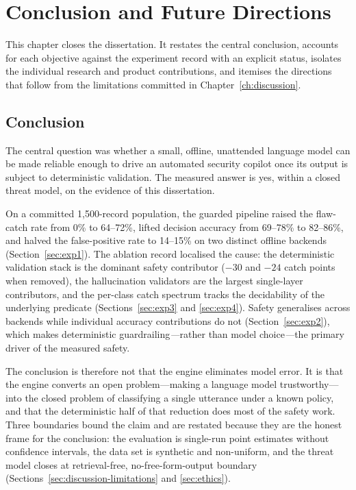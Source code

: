 
\chapter{Conclusion and Future Directions}\label{ch:conclusion}

This chapter closes the dissertation. It restates the central conclusion,
accounts for each objective against the experiment record with an explicit
status, isolates the individual research and product contributions, and
itemises the directions that follow from the limitations committed in
Chapter~\ref{ch:discussion}.

\section{Conclusion}\label{sec:conclusion}

The central question was whether a small, offline, unattended language model
can be made reliable enough to drive an automated security copilot once its
output is subject to deterministic validation. The measured answer is yes,
within a closed threat model, on the evidence of this dissertation.

On a committed 1,500-record population, the guarded pipeline raised the
flaw-catch rate from 0\% to 64--72\%, lifted decision accuracy from 69--78\%
to 82--86\%, and halved the false-positive rate to 14--15\% on two distinct
offline backends (Section~\ref{sec:exp1}). The ablation record localised the
cause: the deterministic validation stack is the dominant safety contributor
($-30$ and $-24$ catch points when removed), the hallucination validators are
the largest single-layer contributors, and the per-class catch spectrum tracks
the decidability of the underlying predicate (Sections~\ref{sec:exp3} and
\ref{sec:exp4}). Safety generalises across backends while individual accuracy
contributions do not (Section~\ref{sec:exp2}), which makes deterministic
guardrailing\emph{---}rather than model choice\emph{---}the primary driver of
the measured safety.

The conclusion is therefore not that the engine eliminates model error. It is
that the engine converts an open problem---making a language model
trustworthy---into the closed problem of classifying a single utterance under a
known policy, and that the deterministic half of that reduction does most of
the safety work. Three boundaries bound the claim and are restated because they
are the honest frame for the conclusion: the evaluation is single-run point
estimates without confidence intervals, the data set is synthetic and
non-uniform, and the threat model closes at retrieval-free, no-free-form-output
boundary (Sections~\ref{sec:discussion-limitations} and \ref{sec:ethics}).

